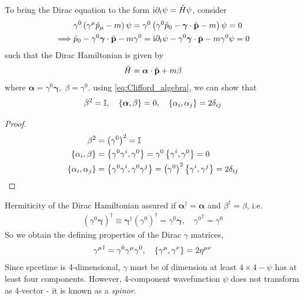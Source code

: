 To bring the Dirac equation to the form $\mathrm{i} \partial_t \psi = \hat{H} \psi$, consider 
\begin{align*}
    & \gamma^ 0 \left( \gamma^ \mu \hat{p}_ \mu -m \right) \psi = \gamma^0 \left( \gamma^0 \hat{p}_0 - \boldsymbol{\gamma}\cdot \hat{\mathbf{p}} - m \right)\psi = 0 \\
    \implies & \hat{p}_0 - \gamma^0 \boldsymbol{\gamma} \cdot \hat{\mathbf{p}} - m \gamma^0 = \mathrm{i} \partial_t \psi - \gamma^0 \boldsymbol{\gamma} \cdot \hat{\mathbf{p}} - m \gamma^0 \psi = 0 \\
\end{align*}
such that the Dirac Hamiltonian is given by 
\begin{align}
    \hat{H} = \boldsymbol{\alpha} \cdot \hat{\mathbf{p}} + m \beta \label{eq:Dirac_Hamiltonian}
\end{align}
where $\boldsymbol{\alpha} = \gamma^0 \boldsymbol{\gamma}, \; \beta = \gamma^0$. using \cref{eq:Clifford_algebra}, we can show that
\begin{align*}
    \beta^2 = \mathbb{I}, \quad \left\{ \boldsymbol{\alpha} , \beta \right\} = 0, \quad \left\{ \alpha_i , \alpha_j \right\} = 2 \delta_{ij} \label{eq:alpha_beta_properties}
\end{align*}
\begin{proof}
    \begin{align*}
        \beta^2 &= \left(\gamma^0\right)^2 = \mathbb{I} \\
        \left\{ \alpha_i , \beta \right\} &= \left\{ \gamma^0 \gamma^i , \gamma^0 \right\} = \gamma^0 \left\{ \gamma^i , \gamma^0 \right\} = 0 \\
        \left\{ \alpha_i , \alpha_j \right\} &= \left\{ \gamma^0 \gamma^i , \gamma^0 \gamma^j \right\} = \left(\gamma^0\right)^2 \left\{ \gamma^i , \gamma^j \right\} = 2 \delta_{ij}
    \end{align*}
\end{proof}
Hermiticity of the Dirac Hamiltonian assured if $\boldsymbol{\alpha}^ \dag = \boldsymbol{\alpha}$ and $\beta^ \dag = \beta$, i.e. 
\begin{align*}
    \left(\gamma^0 \boldsymbol{\gamma}\right)^ \dag \equiv \boldsymbol{\gamma}^ \dag \left(\gamma^0\right)^ \dag = \gamma^0 \boldsymbol{\gamma},  \quad {\gamma^0}^ \dag = \gamma^0
\end{align*}
So we obtain the defining properties of the Dirac $\gamma$ matrices, 
\begin{align*}
    {\gamma^\mu}^ \dag = \gamma^0 \gamma^ \mu \gamma^0, \quad \left\{ \gamma^ \mu , \gamma^ \nu \right\} = 2 \eta^{\mu \nu}
\end{align*}
Since spcetime is 4-dimensional, $\gamma$ must be of dimension at least $4 \times 4 - \psi$ has at least four components. However, 4-component wavefunction $\psi$ does not transform as 4-vector - it is known as a \emph{spinor}.

